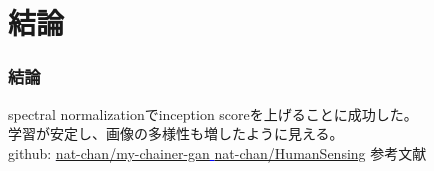 \documentclass[dvipdfmx,12pt]{beamer}
\begin{document}
\section{結論}
\begin{frame}
	\frametitle{結論}
	spectral normalizationでinception scoreを上げることに成功した。\\
	学習が安定し、画像の多様性も増したように見える。\\
	github:
	\textcolor{blue}{
	\underline{
	\href{https://github.com/nat-chan/my-chainer-gan}{nat-chan/my-chainer-gan}
}}
	\href{https://github.com/nat-chan/HumanSensing}{nat-chan/HumanSensing}
	参考文献
\end{frame}
\end{document}
